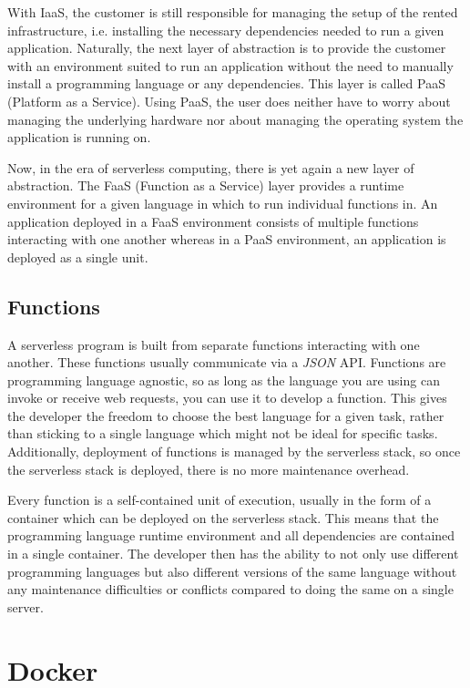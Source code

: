 With IaaS, the customer is still responsible for managing the setup of the rented infrastructure,
i.e. installing the necessary dependencies needed to run a given application. Naturally, the next
layer of abstraction is to provide the customer with an environment suited to run an application
without the need to manually install a programming language or any dependencies. This layer is
called PaaS (Platform as a Service). Using PaaS, the user does neither have to worry about managing the underlying hardware nor about managing the operating system the
application is running on.

Now, in the era of serverless computing, there is yet again a new layer of abstraction. The FaaS
(Function as a Service) layer provides a runtime environment for a given language in which to
run individual functions in. An application deployed in a FaaS environment consists of multiple
functions interacting with one another whereas in a PaaS environment, an application is deployed as
a single unit.

\subsection{Functions}

A serverless program is built from separate functions interacting with one another. These functions
usually communicate via a \textit{JSON} API. Functions are programming language agnostic, so as long as the
language you are using can invoke or receive web requests, you can use it to develop a function.
This gives the developer the freedom to choose the best language for a given task, rather than
sticking to a single language which might not be ideal for specific tasks. Additionally,
deployment of functions is managed by the serverless stack, so once the serverless stack is
deployed, there is no more maintenance overhead.

Every function is a self-contained unit of execution, usually in the form of a container which can
be deployed on the serverless stack. This means that the programming language runtime environment
and all dependencies are contained in a single container. The developer then has the ability to not
only use different programming languages but also different versions of the same language without
any maintenance difficulties or conflicts compared to doing the same on a single server.

\section{Docker}

